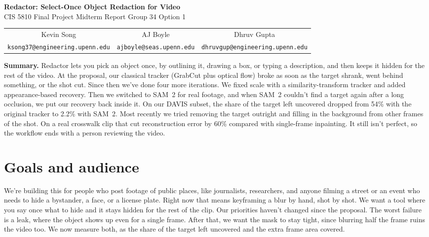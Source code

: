 \documentclass[10pt,letterpaper]{article}
\begin{document}
\begin{center}
{\Large\bfseries Redactor: Select-Once Object Redaction for Video}\\[4pt]
CIS 5810 Final Project Midterm Report \textbullet{} Group 34 \textbullet{} Option 1\\[3pt]
\small
\begin{tabular}{ccc}
Kevin Song & AJ Boyle & Dhruv Gupta \\
\texttt{ksong37@engineering.upenn.edu} & \texttt{ajboyle@seas.upenn.edu} & \texttt{dhruvgup@engineering.upenn.edu}
\end{tabular}
\end{center}

\textbf{Summary.} Redactor lets you pick an object once, by outlining it, drawing a box, or typing
a description, and then keeps it hidden for the rest of the video. At the proposal, our classical
tracker (GrabCut plus optical flow) broke as soon as the target shrank, went behind something, or
the shot cut. Since then we've done four more iterations. We fixed scale with a similarity-transform
tracker and added appearance-based recovery. Then we switched to SAM~2 for real footage, and
when SAM~2 couldn't find a target again after a long occlusion, we put our recovery back inside it.
On our DAVIS subset, the share of the target left uncovered dropped from 54\% with the original
tracker to 2.2\% with SAM~2. Most recently we tried removing the target outright and filling in
the background from other frames of the shot. On a real crosswalk clip that cut reconstruction
error by 60\% compared with single-frame inpainting. It still isn't perfect, so the workflow ends
with a person reviewing the video.

\section{Goals and audience}

We're building this for people who post footage of public places, like journalists, researchers,
and anyone filming a street or an event who needs to hide a bystander, a face, or a license plate.
Right now that means keyframing a blur by hand, shot by shot. We want a tool where you say once
what to hide and it stays hidden for the rest of the clip. Our priorities haven't changed since the
proposal. The worst failure is a leak, where the object shows up even for a single frame. After
that, we want the mask to stay tight, since blurring half the frame ruins the video too. We now
measure both, as the share of the target left uncovered and the extra frame area covered.
\end{document}
